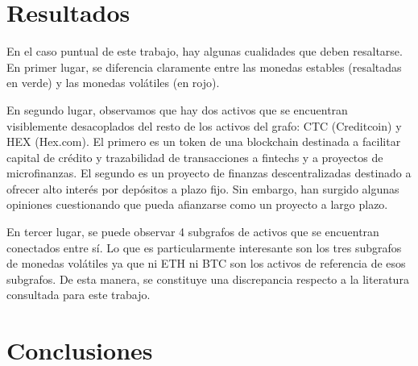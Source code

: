 \documentclass[runningheads,a4paper,10pt]{etc/llncs}
\let\stdsection\section
\renewcommand\section{\newpage\stdsection}
\begin{document}
\section{Resultados}

En el caso puntual de este trabajo, hay algunas cualidades que deben resaltarse. En primer lugar, se diferencia claramente entre las monedas estables (resaltadas en verde) y las monedas volátiles (en rojo). 

En segundo lugar, observamos que hay dos activos que se encuentran visiblemente desacoplados del resto de los activos del grafo: CTC (Creditcoin) y HEX (Hex.com). El primero es un token de una blockchain destinada a facilitar capital de crédito y trazabilidad de transacciones a fintechs y a proyectos de microfinanzas. El segundo es un proyecto de finanzas descentralizadas destinado a ofrecer alto interés por depósitos a plazo fijo. Sin embargo, han surgido algunas opiniones cuestionando que pueda afianzarse como un proyecto a largo plazo.

En tercer lugar, se puede observar 4 subgrafos de activos que se encuentran conectados entre sí. Lo que es particularmente interesante son los tres subgrafos de monedas volátiles ya que ni ETH ni BTC son los activos de referencia de esos subgrafos. De esta manera, se constituye una discrepancia respecto a la literatura consultada para este trabajo.

\section{Conclusiones}


\printbibliography[citations]
\end{document}
